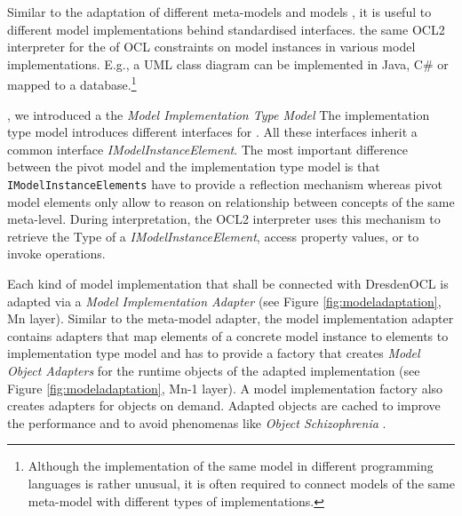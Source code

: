 	Similar to the adaptation of different meta-models and models , it is
	useful to  different model implementations
	 behind standardised interfaces. the same OCL2 interpreter for the  of OCL constraints on model instances in various model
	implementations.  E.g., a UML class diagram can be
	implemented in Java, C\# or mapped to a database.\footnote{ Although the implementation of the same model in different
	programming languages is rather unusual, it is often required to connect models 
	of the same meta-model with different types of implementations.} 
	
	, we introduced a the \textit{Model Implementation
	Type Model}  The implementation type model introduces different
	interfaces for . All these
	interfaces inherit a common interface \textit{IModelInstanceElement}. The most 
	important difference between the pivot model and the implementation type model
	is that \texttt{IModelInstanceElements} have to provide a reflection mechanism whereas 
	pivot model elements only allow to reason on relationship between concepts of
	the same meta-level. During interpretation, the OCL2 interpreter uses this mechanism to
	retrieve the Type of a \textit{IModelInstanceElement}, access property
	values, or to invoke operations. 
	
	Each kind of model implementation that shall be connected with DresdenOCL is
	adapted via a \textit{Model Implementation Adapter} (see Figure
	\ref{fig:modeladaptation}, Mn layer). Similar to the meta-model adapter, 
	the model implementation adapter contains adapters that map elements of a
	concrete model instance to elements to implementation type model and has to
	provide a factory that creates \textit{Model Object Adapters} for the runtime 
	objects of the adapted implementation  (see Figure \ref{fig:modeladaptation}, Mn-1 layer). 
	A model implementation factory also 
	creates adapters for objects on demand. Adapted objects are cached to
	improve the performance and to avoid phenomenas like \textit{Object
	Schizophrenia} .


